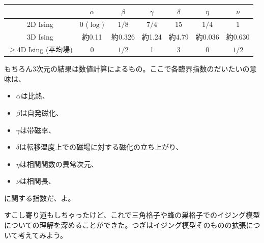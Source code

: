 \documentclass[paper=b5j,fontsize=12Q,jafontsize=12Q,baselineskip=21Q]{jlreq}
\begin{document}
\begin{refsection}
\begin{center}
\begin{tabular}{c||c|c|c|c|c|c}
  \hline
   & $\alpha$ & $\beta$ & $\gamma$ & $\delta$ & $\eta$ & $\nu$ \\
  \hline\hline
  2D Ising & 0 ($\log$) & $1/8$ & $7/4$ & 15 & $1/4$ & 1 \\
  \hline
  3D Ising & 約0.11 & 約0.326 & 約1.24 & 約4.79 & 約0.036 & 約0.630 \\
  \hline
  $\ge$4D Ising (平均場) & 0 & $1/2$ & 1 & 3 & 0 & $1/2$ \\
  \hline
\end{tabular}
\end{center}

もちろん3次元の結果は数値計算によるもの。ここで各臨界指数のだいたいの意味は、
\begin{itemize}
  \item $\alpha$は比熱、
  \item $\beta$は自発磁化、
  \item $\gamma$は帯磁率、
  \item $\delta$は転移温度上での磁場に対する磁化の立ち上がり、
  \item $\eta$は相関関数の異常次元、
  \item $\nu$は相関長、
\end{itemize}
に関する指数だ、よ。

すこし寄り道もしちゃったけど、これで三角格子や蜂の巣格子でのイジング模型についての理解を深めることができた。つぎはイジング模型そのものの拡張について考えてみよう。


\end{refsection}
\end{document}
